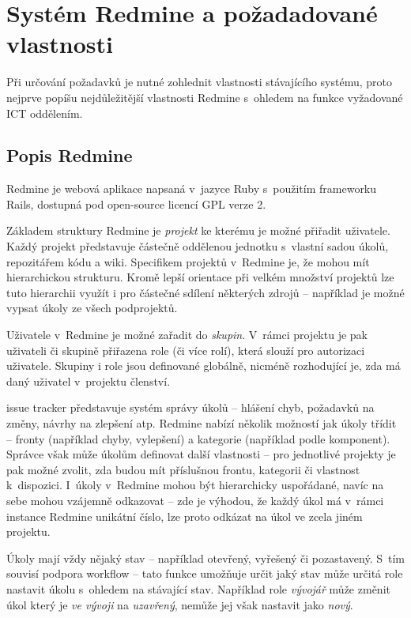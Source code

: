 \documentclass[thesis=B,czech]{FITthesis}[2012/05/02]
\begin{document}
\chapter{Systém Redmine a požadadované vlastnosti}

Při určování požadavků je nutné zohlednit vlastnosti stávajícího
systému, proto nejprve popíšu nejdůležitější vlastnosti Redmine
s~ohledem na funkce vyžadované ICT oddělením.

\section{Popis Redmine}

Redmine je webová aplikace napsaná v~jazyce Ruby s~použitím frameworku
Rails, dostupná pod open-source licencí \gls{GPL} verze 2.

Základem struktury Redmine je \emph{projekt} ke kterému je možné
přiřadit uživatele. Každý projekt představuje částečně oddělenou
jednotku s~vlastní sadou úkolů, repozitářem kódu a \gls{wiki}.
Specifikem projektů v~Redmine je, že mohou mít hierarchickou strukturu.
Kromě lepší orientace při velkém množství projektů lze tuto hierarchii
využít i pro částečné sdílení některých zdrojů -- například je možné
vypsat úkoly ze všech podprojektů.

Uživatele v~Redmine je možné zařadit do \emph{skupin}. V~rámci projektu
je pak uživateli či skupině přiřazena role (či více rolí), která slouží
pro autorizaci uživatele. Skupiny i role jsou definované globálně,
nicméně rozhodující je, zda má daný uživatel v~projektu členství.

\Gls{issue tracker} představuje systém správy úkolů -- hlášení chyb,
požadavků na změny, návrhy na zlepšení atp. Redmine nabízí několik
možností jak úkoly třídit -- fronty (například chyby, vylepšení) a
kategorie (například podle komponent). Správce však může úkolům
definovat další vlastnosti -- pro jednotlivé projekty je pak možné
zvolit, zda budou mít příslušnou frontu, kategorii či vlastnost
k~dispozici. I~úkoly v~Redmine mohou být hierarchicky uspořádané, navíc na
sebe mohou vzájemně odkazovat -- zde je výhodou, že každý úkol má
v~rámci instance Redmine unikátní číslo, lze proto odkázat na úkol ve
zcela jiném projektu.

Úkoly mají vždy nějaký stav -- například otevřený, vyřešený či
pozastavený. S~tím souvisí podpora \gls{workflow} -- tato funkce
umožňuje určit jaký stav může určitá role nastavit úkolu s~ohledem na
stávající stav. Například role \emph{vývojář} může změnit úkol který je
\emph{ve vývoji} na \emph{uzavřený}, nemůže jej však nastavit jako
\emph{nový}.
\end{document}
